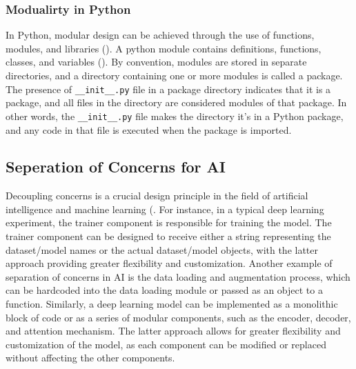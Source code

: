 \subsubsection{Modualirty in Python}
In Python, modular design can be achieved through the use of functions, modules, and libraries (\cite{sanner1999python}). 
A python module contains definitions, functions, classes, and variables (\cite{raschka2015python}). By convention, modules are stored in separate directories, and a directory containing one or more modules is called a package. The presence of \verb|__init__.py| file in a package directory indicates that it is a package, and all files in the directory are considered modules of that package. In other words, the \verb|__init__.py| file makes the directory it's in a Python package, and any code in that file is executed when the package is imported.


\subsection{Seperation of Concerns for AI}


Decoupling concerns is a crucial design principle in the field of artificial intelligence and machine learning (\cite{mo2016decoupling,qian2006decoupling, pressman2010software}. For instance, in a typical deep learning experiment, the trainer component is responsible for training the model. The trainer component can be designed to receive either a string representing the dataset/model names or the actual dataset/model objects, with the latter approach providing greater flexibility and customization. Another example of separation of concerns in AI is the data loading and augmentation process, which can be hardcoded into the data loading module or passed as an object to a function. Similarly, a deep learning model can be implemented as a monolithic block of code or as a series of modular components, such as the encoder, decoder, and attention mechanism. The latter approach allows for greater flexibility and customization of the model, as each component can be modified or replaced without affecting the other components.




